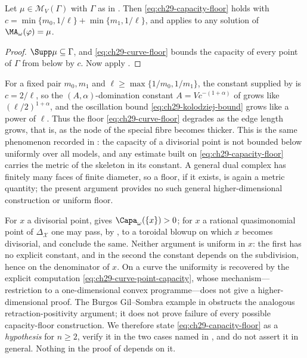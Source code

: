 \begin{corollary}
\label{cor:ch29-curve-floor}
Let $\mu\in\mathcal M_V(\Gamma)$ with $\Gamma$ as in
.  Then
\eqref{eq:ch29-capacity-floor} holds with
$c=\min\{m_0,1/\ell\}+\min\{m_1,1/\ell\}$, and
 applies to any solution of
$\MA_\omega(\varphi)=\mu$.
\end{corollary}

\begin{proof}
$\Supp\mu\subseteq\Gamma$, and \eqref{eq:ch29-curve-floor} bounds the
capacity of every point of $\Gamma$ from below by $c$.  Now apply
.
\end{proof}

\begin{remark}
\label{rem:ch29-floor-metric}
For a fixed pair $m_0,m_1$ and $\ell\geq\max\{1/m_0,1/m_1\}$, the
constant supplied by  is $c=2/\ell$, so the
$(A,\alpha)$-domination constant $A=Vc^{-(1+\alpha)}$ of
 grows like $(\ell/2)^{1+\alpha}$, and the
oscillation bound \eqref{eq:ch29-kolodziej-bound} grows like a power of
$\ell$.  Thus the floor \eqref{eq:ch29-curve-floor} degrades as the edge
length grows, that is, as the node of the special fibre becomes thicker.
This is the same phenomenon recorded in
: the capacity of a divisorial point is not
bounded below uniformly over all models, and any estimate built on
\eqref{eq:ch29-capacity-floor} carries the metric of the skeleton in its
constant.  A general dual complex has finitely many faces of finite
diameter, so a floor, if it exists, is again a metric quantity; the present argument provides no such general higher-dimensional
construction or uniform floor.
\end{remark}

\begin{remark}
\label{rem:ch29-floor-open}
For $x$ a divisorial point,  gives
$\Capa_\omega(\{x\})>0$; for $x$ a rational quasimonomial point of
$\Delta_{\mathcal X}$ one may pass, by
, to a toroidal blowup on which $x$ becomes
divisorial, and conclude the same.  Neither argument is uniform in $x$:
the first has no explicit constant, and in the second the constant depends
on the subdivision, hence on the denominator of $x$.  On a curve the
uniformity is recovered by the explicit computation
\eqref{eq:ch29-curve-point-capacity}, whose mechanism---restriction to a
one-dimensional convex programme---does not give a higher-dimensional proof.  The Burgos Gil--Sombra
example in  obstructs the analogous
retraction-positivity argument; it does not prove failure of every
possible capacity-floor construction.  We therefore state
\eqref{eq:ch29-capacity-floor} as a \emph{hypothesis} for $n\geq2$, verify
it in the two cases named in , and do not
assert it in general.  Nothing in the proof of
 depends on it.
\end{remark}


